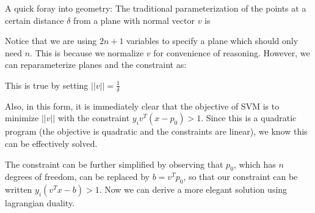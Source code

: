 \documentclass[12pt]{article}
\begin{document}
A quick foray into geometry:
The traditional parameterization of the points at a certain distance $\delta$ from a plane with normal vector $v$ is

Notice that we are using $2n+1$ variables to specify a plane which should only need $n$. This is because we normalize $v$ for convenience of reasoning. However, we can reparameterize planes and the constraint as:

This is true by setting $||v|| = \frac{1}{\delta}$

\iffalse
This can be derived by using the magnitude of $v$ to indicate the offset of the plane. By setting

\eq{
  ||v|| &= \frac{1-v^Tp_0}{\delta} \\
  \delta &= \frac{1-v^Tp_0}{||v||}
  \intertext{We can plug this back into the original expression to get}
  \frac{1}{||v||}v^T(x-p_0) &= \frac{1-v^Tp_0}{||v||}\\
  v^Tx - v^Tp_0 &= 1-v^Tp_0 \\
  v^Tx &= 1
}
\fi

Also, in this form, it is immediately clear that the objective of SVM is to minimize $||v||$ with the constraint $y_i v^T(x-p_0) > 1$. Since this is a quadratic program (the objective is quadratic and the constraints are linear), we know this can be effectively solved.

The constraint can be further simplified by observing that $p_0$, which has $n$ degrees of freedom, can be replaced by $b = v^Tp_0$, so that our constraint can be written $y_i (v^Tx - b) > 1$. Now we can derive a more elegant solution using lagrangian duality. 

\end{document}
